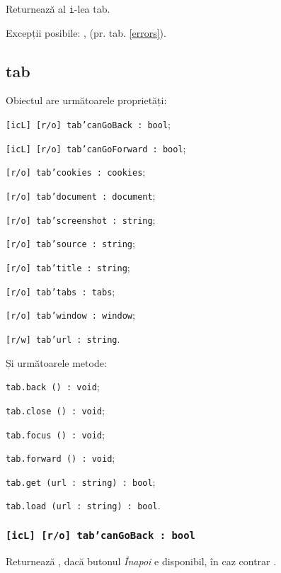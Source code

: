 Returnează al \texttt{i}-lea tab.

Excepții posibile: ,  (pr. tab. \ref{errors}).

\subsection{{\color{orange} tab}}

Obiectul \tab{} are următoarele proprietăți:
\begin{icItems}
	\item \texttt{[icL] [r/o] tab'canGoBack : bool};
	\item \texttt{[icL] [r/o] tab'canGoForward : bool};
	\item \texttt{[r/o] tab'cookies : cookies};
	\item \texttt{[r/o] tab'document : document};
	\item \texttt{[r/o] tab'screenshot : string};
	\item \texttt{[r/o] tab'source : string};
	\item \texttt{[r/o] tab'title : string};
	\item \texttt{[r/o] tab'tabs : tabs};
	\item \texttt{[r/o] tab'window : window};
	\item \texttt{[r/w] tab'url : string}.
\end{icItems}

Și următoarele metode:
\begin{icItems}
	\item \texttt{tab.back () : void};
	\item \texttt{tab.close () : void};
	\item \texttt{tab.focus () : void};
	\item \texttt{tab.forward () : void};
	\item \texttt{tab.get (url : string) : bool};
	\item \texttt{tab.load (url : string) : bool}.
\end{icItems}

\subsubsection{\texttt{[icL] [r/o] tab'canGoBack : bool}}

Returnează \true, dacă butonul \textit{Înapoi} e disponibil, în caz contrar \false.

